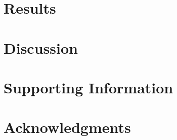 \documentclass[10pt,letterpaper]{article}
\begin{document}
\section*{Results}



\section*{Discussion}


\section*{Supporting Information}



\section*{Acknowledgments}

\nolinenumbers

%
%


\end{document}
